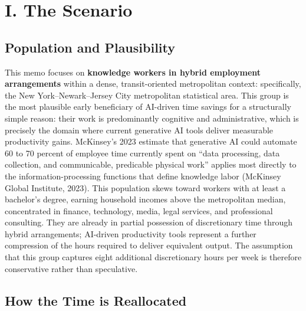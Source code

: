 \documentclass[10pt, twocolumn]{article}
\begin{document}

\section*{I. The Scenario}

\subsection*{Population and Plausibility}

This memo focuses on \textbf{knowledge workers in hybrid employment arrangements} within a dense, transit-oriented metropolitan context: specifically, the New York--Newark--Jersey City metropolitan statistical area. This group is the most plausible early beneficiary of AI-driven time savings for a structurally simple reason: their work is predominantly cognitive and administrative, which is precisely the domain where current generative AI tools deliver measurable productivity gains. McKinsey's 2023 estimate that generative AI could automate 60 to 70 percent of employee time currently spent on ``data processing, data collection, and communicable, predicable physical work'' applies most directly to the information-processing functions that define knowledge labor (McKinsey Global Institute, 2023). This population skews toward workers with at least a bachelor's degree, earning household incomes above the metropolitan median, concentrated in finance, technology, media, legal services, and professional consulting. They are already in partial possession of discretionary time through hybrid arrangements; AI-driven productivity tools represent a further compression of the hours required to deliver equivalent output. The assumption that this group captures eight additional discretionary hours per week is therefore conservative rather than speculative.

\subsection*{How the Time is Reallocated}
\end{document}
